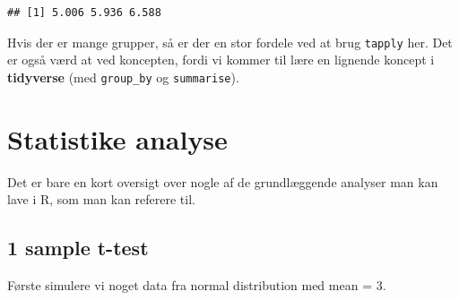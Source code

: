 \documentclass[
]{book}
\newenvironment{Shaded}{\begin{snugshade}}{\end{snugshade}}
\newcommand{\CommentTok}[1]{\textcolor[rgb]{0.56,0.35,0.01}{\textit{#1}}}
\newcommand{\FunctionTok}[1]{\textcolor[rgb]{0.00,0.00,0.00}{#1}}
\newcommand{\NormalTok}[1]{#1}
\newcommand{\OtherTok}[1]{\textcolor[rgb]{0.56,0.35,0.01}{#1}}
\newcommand{\SpecialCharTok}[1]{\textcolor[rgb]{0.00,0.00,0.00}{#1}}
\newcommand{\StringTok}[1]{\textcolor[rgb]{0.31,0.60,0.02}{#1}}
\begin{document}
\begin{Shaded}
\end{Shaded}

\begin{verbatim}
## [1] 5.006 5.936 6.588
\end{verbatim}

Hvis der er mange grupper, så er der en stor fordele ved at brug \texttt{tapply} her. Det er også værd at ved koncepten, fordi vi kommer til lære en lignende koncept i \textbf{tidyverse} (med \texttt{group\_by} og \texttt{summarise}).

\hypertarget{statistike-analyse}{%
\section{Statistike analyse}\label{statistike-analyse}}

Det er bare en kort oversigt over nogle af de grundlæggende analyser man kan lave i R, som man kan referere til.

\hypertarget{sample-t-test}{%
\subsection{1 sample t-test}\label{sample-t-test}}

Første simulere vi noget data fra normal distribution med mean = 3.
\end{document}
